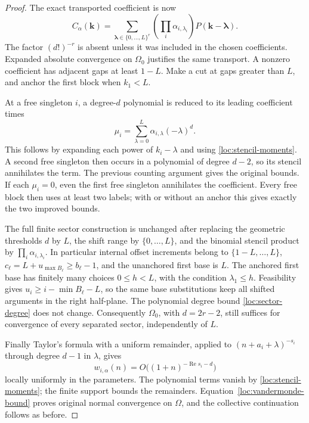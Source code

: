 \documentclass[11pt,a4paper]{article}
\numberwithin{equation}{section}
\theoremstyle{definition}
\theoremstyle{remark}
\newcommand{\Rea}{\operatorname{Re}}
\begin{document}
\begin{proof}
The exact transported coefficient is now
\begin{equation}
 C_\alpha(\mathbf k)=
   \sum_{\boldsymbol\lambda\in\{0,\ldots,L\}^r}
          \left(\prod_i\alpha_{i,\lambda_i}\right)
          P(\mathbf k-\boldsymbol\lambda).
 \label{loc:general-coefficient}
\end{equation}
The factor $(d!)^{-r}$ is absent unless it was included in the chosen
coefficients.  Expanded absolute convergence on $\Omega_0$ justifies
the same transport.  A nonzero coefficient has adjacent gaps at least
$1-L$.  Make a cut at gaps greater than $L$, and anchor the first
block when $k_1<L$.

At a free singleton $i$, a degree-$d$ polynomial is reduced to its
leading coefficient times
\[
 \mu_i=\sum_{\lambda=0}^L
                 \alpha_{i,\lambda}(-\lambda)^d.
\]
This follows by expanding each power of $k_i-\lambda$ and using
\eqref{loc:stencil-moments}.  A second free singleton then occurs in
a polynomial of degree $d-2$, so its stencil annihilates the term.
The previous counting argument gives the original bounds.  If each
$\mu_i=0$, even the first free singleton annihilates the coefficient.
Every free block then uses at least two labels; with or without an
anchor this gives exactly the two improved bounds.

The full finite sector construction is unchanged after replacing the
geometric thresholds $d$ by $L$, the shift range by $\{0,\ldots,L\}$,
and the binomial stencil product by $\prod_i\alpha_{i,\lambda_i}$.
In particular internal offset increments belong to
$\{1-L,\ldots,L\}$, $c_\ell=L+u_{\max B_\ell}\ge b_\ell-1$, and
the unanchored first base is $L$.  The anchored first base has finitely
many choices $0\le h<L$, with the condition $\lambda_1\le h$.
Feasibility gives $u_i\ge i-\min B_\ell-L$, so the same base
substitutions keep all shifted arguments in the right half-plane.
The polynomial degree bound \eqref{loc:sector-degree} does not change.
Consequently $\Omega_0$, with $d=2r-2$, still suffices for convergence
of every separated sector, independently of $L$.

Finally Taylor's formula with a uniform remainder, applied to
$(n+a_i+\lambda)^{-s_i}$ through degree $d-1$ in $\lambda$, gives
\[
 w_{i,\alpha}(n)=O\bigl((1+n)^{-\Rea s_i-d}\bigr)
\]
locally uniformly in the parameters.  The polynomial terms vanish by
\eqref{loc:stencil-moments}; the finite support bounds the remainders.
Equation~\eqref{loc:vandermonde-bound} proves original normal
convergence on $\Omega$, and the collective continuation follows as
before.
\end{proof}
\end{document}
